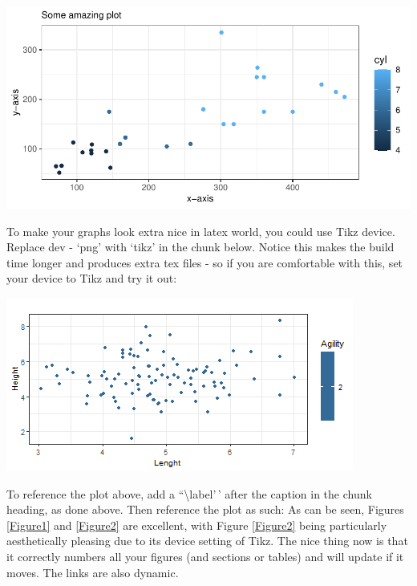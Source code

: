 \documentclass[12pt,preprint, authoryear]{elsarticle}
\let\origfigure\figure
\let\endorigfigure\endfigure
\renewenvironment{figure}[1][2] {
    \expandafter\origfigure\expandafter[H]
} {
    \endorigfigure
}
\numberwithin{equation}{section}
\numberwithin{figure}{section}
\numberwithin{table}{section}
\begin{document}
\begin{figure}[H]

{\centering \includegraphics{DCC_GARCH_22582053_files/figure-latex/Figure1-1} 

}

\caption{Caption Here \label{Figure1}}\label{fig:Figure1}
\end{figure}

To make your graphs look extra nice in latex world, you could use Tikz
device. Replace dev - `png' with `tikz' in the chunk below. Notice this
makes the build time longer and produces extra tex files - so if you are
comfortable with this, set your device to Tikz and try it out:

\begin{figure}[H]

{\centering \includegraphics{DCC_GARCH_22582053_files/figure-latex/Figure2-1} 

}

\caption{Caption Here \label{Figure2}}\label{fig:Figure2}
\end{figure}

To reference the plot above, add a ``\textbackslash label'\,' after the
caption in the chunk heading, as done above. Then reference the plot as
such: As can be seen, Figures \ref{Figure1} and \ref{Figure2} are
excellent, with Figure \ref{Figure2} being particularly aesthetically
pleasing due to its device setting of Tikz. The nice thing now is that
it correctly numbers all your figures (and sections or tables) and will
update if it moves. The links are also dynamic.
\end{document}

